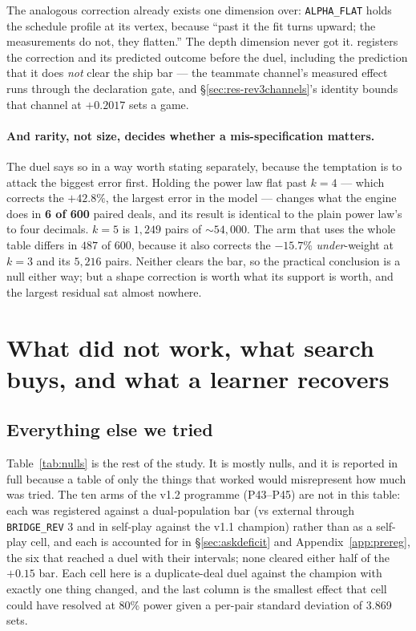 \documentclass[11pt,letterpaper]{article}
\begin{document}
The analogous correction already exists one dimension over: \texttt{ALPHA\_FLAT}
holds the schedule profile at its vertex, because ``past it the fit turns
upward; the measurements do not, they flatten.'' The depth dimension never got
it.  registers the correction and its
predicted outcome before the duel, including the prediction that it does
\emph{not} clear the ship bar --- the teammate channel's measured effect runs
through the declaration gate, and \S\ref{sec:res-rev3channels}'s identity bounds
that channel at $+0.2017$ sets a game.

\paragraph{And rarity, not size, decides whether a mis-specification matters.}
The duel says so in a way worth stating separately, because the temptation is to
attack the biggest error first. Holding the power law flat past $k=4$ --- which
corrects the $+42.8\%$, the largest error in the model --- changes what the
engine does in \textbf{6 of 600} paired deals, and its result is identical to
the plain power law's to four decimals. $k=5$ is $1{,}249$ pairs of
${\sim}54{,}000$. The arm that uses the whole table differs in $487$ of $600$,
because it also corrects the $-15.7\%$ \emph{under}-weight at $k=3$ and its
$5{,}216$ pairs. Neither clears the bar, so the practical conclusion is a null
either way; but a shape correction is worth what its support is worth, and the
largest residual sat almost nowhere.

\section{What did not work, what search buys, and what a learner recovers}
\label{sec:negative}

\subsection{Everything else we tried}
\label{sec:res-null}

Table~\ref{tab:nulls} is the rest of the study. It is mostly nulls, and it is
reported in full because a table of only the things that worked would
misrepresent how much was tried. The ten arms of the v1.2 programme
(P43--P45) are not in this table: each was registered against a
dual-population bar (vs external through \texttt{BRIDGE\_REV} 3 and in
self-play against the v1.1 champion) rather than as a self-play cell, and each
is accounted for in \S\ref{sec:askdeficit} and Appendix~\ref{app:prereg},
the six that reached a duel with their intervals; none cleared either half of
the $+0.15$ bar. Each cell here is a duplicate-deal duel against the
champion with exactly one thing changed, and the last column is the smallest
effect that cell could have resolved at 80\% power given a per-pair standard
deviation of 3.869 sets.
\end{document}
